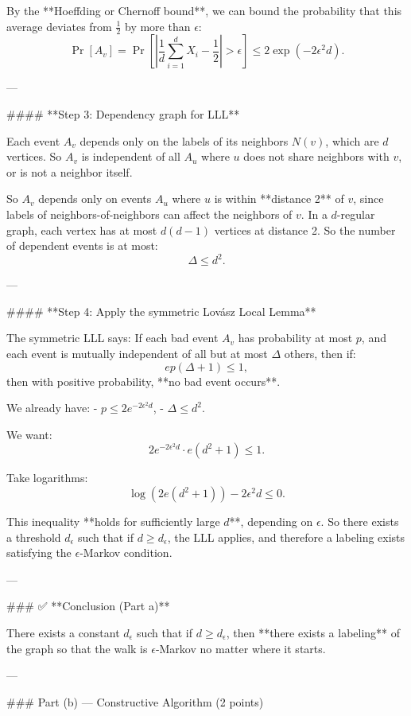 \begin{enumerate}
\begin{shaded}
By the **Hoeffding or Chernoff bound**, we can bound the probability that this average deviates from \( \frac{1}{2} \) by more than \( \epsilon \):
\[
\Pr[A_v] = \Pr\left[ \left| \frac{1}{d} \sum_{i=1}^d X_i - \frac{1}{2} \right| > \epsilon \right] \leq 2\exp(-2\epsilon^2 d).
\]

---

#### **Step 3: Dependency graph for LLL**

Each event \( A_v \) depends only on the labels of its neighbors \( N(v) \), which are \( d \) vertices. So \( A_v \) is independent of all \( A_u \) where \( u \) does not share neighbors with \( v \), or is not a neighbor itself.

So \( A_v \) depends only on events \( A_u \) where \( u \) is within **distance 2** of \( v \), since labels of neighbors-of-neighbors can affect the neighbors of \( v \). In a \( d \)-regular graph, each vertex has at most \( d(d-1) \) vertices at distance 2. So the number of dependent events is at most:
\[
\Delta \leq d^2.
\]

---

#### **Step 4: Apply the symmetric Lovász Local Lemma**

The symmetric LLL says: If each bad event \( A_v \) has probability at most \( p \), and each event is mutually independent of all but at most \( \Delta \) others, then if:
\[
ep(\Delta + 1) \leq 1,
\]
then with positive probability, **no bad event occurs**.

We already have:
- \( p \leq 2e^{-2\epsilon^2 d} \),
- \( \Delta \leq d^2 \).

We want:
\[
2e^{-2\epsilon^2 d} \cdot e(d^2 + 1) \leq 1.
\]

Take logarithms:
\[
\log(2e(d^2 + 1)) - 2\epsilon^2 d \leq 0.
\]

This inequality **holds for sufficiently large \( d \)**, depending on \( \epsilon \). So there exists a threshold \( d_\epsilon \) such that if \( d \geq d_\epsilon \), the LLL applies, and therefore a labeling exists satisfying the \( \epsilon \)-Markov condition.

---

### ✅ **Conclusion (Part a)**

There exists a constant \( d_\epsilon \) such that if \( d \geq d_\epsilon \), then **there exists a labeling** of the graph so that the walk is \( \epsilon \)-Markov no matter where it starts.

---

### Part (b) — Constructive Algorithm (2 points)


\end{shaded}
\end{enumerate}
